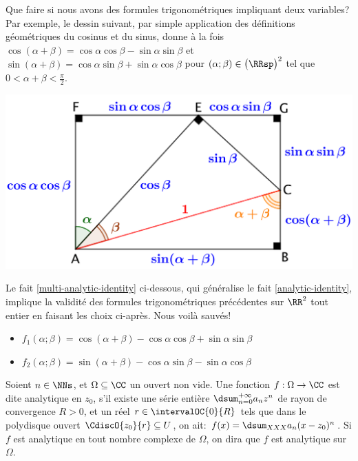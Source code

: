 Que faire si nous avons des formules trigonométriques impliquant deux variables? Par exemple, le dessin suivant, par simple application des définitions géométriques du cosinus et du sinus, donne à la fois
$\cos(\alpha + \beta) = \cos \alpha \cos \beta - \sin \alpha \sin \beta$
et
$\sin(\alpha + \beta) = \cos \alpha \sin \beta + \sin \alpha \cos \beta$
pour
$(\alpha ; \beta) \in \big( \RRsp \big)^2$ tel que $0 < \alpha + \beta < \frac{\pi}{2}$. 

\begin{center}
	\includegraphics[scale=.7]{two-var-trig-formulas.png}
\end{center}

Le fait \ref{multi-analytic-identity} ci-dessous, qui généralise le fait \ref{analytic-identity}, implique la validité des formules trigonométriques précédentes sur $\RR^2$ tout entier en faisant les choix ci-après.
Nous voilà sauvés!
%
\begin{itemize}[label=\small\textbullet]
	\item $f_1(\alpha ; \beta) = \cos(\alpha + \beta) - \cos \alpha \cos \beta + \sin \alpha \sin \beta$

	\item $f_2(\alpha ; \beta) = \sin(\alpha + \beta) - \cos \alpha \sin \beta - \sin \alpha \cos \beta$
\end{itemize}






\begin{defi}
    Soient $n \in \NNs$, et $\Omega \subseteq \CC$ un ouvert non vide.
	Une fonction $f: \Omega \rightarrow \CC$ est dite analytique en $z_0$, 
	s'il existe
	une série entière $\dsum_{n = 0}^{+\infty} a_n z^n$
	de rayon de convergence $R > 0$,
	et
	un réel $r \in \intervalOC{0}{R}$ tels que dans le polydisque ouvert $\CdiscO{z_0}{r} \subseteq U$, on ait:
	$f(x) = \dsum_{XXX} a_n (x - z_0)^n$.
	Si $f$ est analytique en tout nombre complexe de $\Omega$, on dira que $f$ est analytique sur $\Omega$.
\end{defi}




